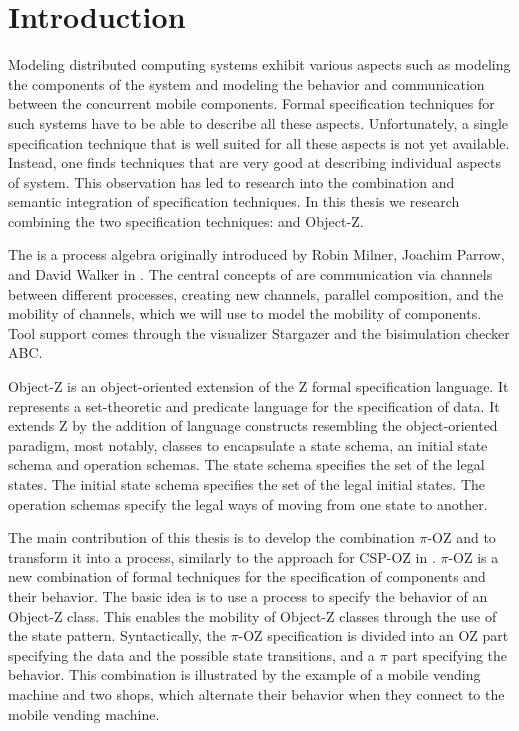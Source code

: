 \chapter{Introduction}
\pagestyle{scrheadings}	
\setcounter{page}{0}
\label{chp_introduction}
Modeling distributed computing systems exhibit various aspects such as modeling the components of the system and modeling the behavior and communication between the concurrent mobile components. Formal specification techniques for such systems have to be able to describe all these aspects. Unfortunately, a single specification technique that is well suited for all these aspects is not yet available. Instead, one finds techniques that are very good at describing individual aspects of system. This observation has led to research into the combination and semantic integration of specification techniques. In this thesis we research combining the two specification techniques:
\picalc{} and Object-Z.

The \picalc{} is a process algebra originally introduced by Robin Milner, Joachim Parrow, and David Walker in \cite{milner1992calculus}. The central concepts of \picalc{} are communication via channels between different processes, creating new channels, parallel composition, and the mobility of channels, which we will use to model the mobility of components. Tool support comes through the \picalc{} visualizer Stargazer and the bisimulation checker ABC.

Object-Z \cite{smith2000the} is an object-oriented extension of the Z formal specification language. It represents a set-theoretic and predicate language for the specification of data. It extends Z by the addition of language constructs resembling the object-oriented paradigm, most notably, classes to encapsulate a state schema, an initial state schema and operation schemas. The state schema specifies the set of the legal states. The initial state schema specifies the set of the legal initial states. The operation schemas specify the legal ways of moving from one state to another.


The main contribution of this thesis is to develop the combination $\pi$-OZ and to transform it into a \picalc{} process, similarly to the approach for CSP-OZ in \cite{olderog}. $\pi$-OZ is a new combination of formal techniques for the specification of components and their behavior. The basic idea is to use a \picalc{} process to specify the behavior of an Object-Z class. This enables the mobility of Object-Z classes through the use of the state pattern. Syntactically, the $\pi$-OZ specification is divided into an OZ part specifying the data and the possible state transitions, and a $\pi$ part specifying the behavior.  This combination is illustrated by the example of a mobile vending machine and two shops, which alternate their behavior when they connect to the mobile vending machine.


